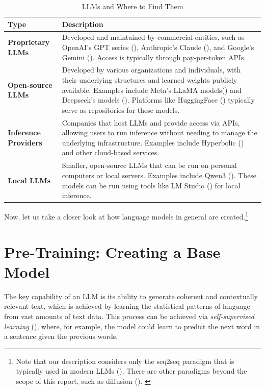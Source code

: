\documentclass{article} %
\begin{document}
\begin{table}[h]
\centering
\begin{tabular}{p{}p{}}
\toprule
\textbf{Type} & \textbf{Description} \\
\midrule
\textbf{Proprietary LLMs} & Developed and maintained by commercial entities, 
    such as OpenAI's GPT series (\cite{ChatGPT-2022}), Anthropic's Claude (\cite{Anthropic-2025}), 
    and Google's Gemini (\cite{Google-2025}). Access is typically through pay-per-token APIs. \\
\addlinespace
\textbf{Open-source LLMs} & Developed by various organizations and individuals, 
with their underlying structures and learned weights publicly available. \newline 
    Examples include Meta's LLaMA models(\cite{Meta-2023}) and Deepseek's models (\cite{Deepseek-2024,Deepseek-2025}). \newline 
    Platforms like HuggingFace (\cite{Huggingface}) typically serve as repositories for these models. \\
\addlinespace
\textbf{Inference Providers} & Companies that host LLMs and provide access via APIs, \newline 
    allowing users to run inference without needing to manage the underlying infrastructure. \newline 
    Examples include Hyperbolic (\cite{Hyperbolic}) and other cloud-based services. \\
\addlinespace
\textbf{Local LLMs} & Smaller, open-source LLMs that can be run on personal computers \newline 
    or local servers. Examples include Qwen3 (\cite{Alibaba-2025}). \newline 
    These models can be run using tools like LM Studio (\cite{LMStudio}) for local inference. \\
\bottomrule
\end{tabular}
\caption{LLMs and Where to Find Them}
\label{tab:llm_types}
\end{table}

Now, let us take a closer look at how language models in general are created.\footnote{
    Note that our description considers only the seq2seq paradigm that is typically used in modern LLMs (\cite{Sutskever-et-al-2014}).
    There are other paradigms beyond the scope of this report, such as diffusion (\cite{Nie-et-al-2025}).
    \label{fn:seq2seq}
}

\section{Pre-Training: Creating a Base Model}
The key capability of an LLM is its ability to generate coherent and contextually relevant text,
which is achieved by learning the statistical patterns of language from vast amounts of text data.
This process can be achieved via \textit{self-supervised learning} (\cite{Karpathy-2025}),
where, for example, the model could learn to predict the next word in a sentence given the previous words. 
\end{document}
